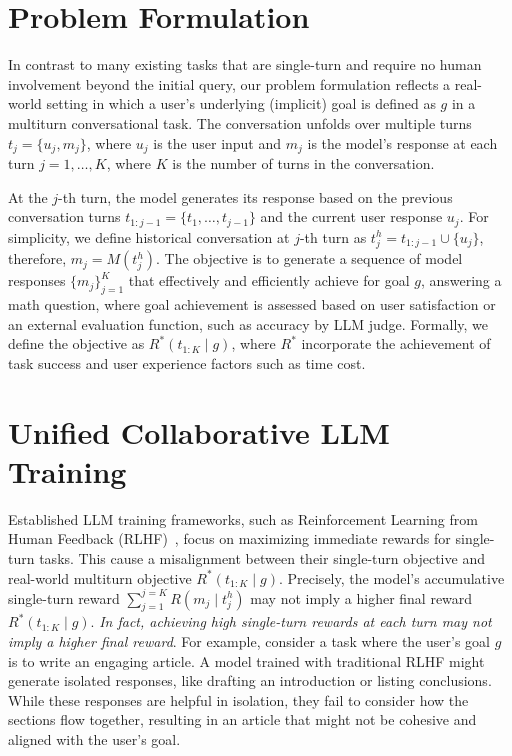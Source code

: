 
\section{Problem Formulation}






\label{sec:formulation}
In contrast to many existing tasks that are single-turn and require no human involvement beyond the initial query, our problem formulation reflects a real-world setting in which a user's underlying (implicit) goal is defined as $g$ in a multiturn conversational task. The conversation unfolds over multiple turns $t_j = \{u_j, m_j\}$, where $u_j$  is the user input and $m_j$  is the model's response at each turn $j = 1, \dots, K$, where $K$ is the number of turns in the conversation. 

At the $j$-th turn, the model generates its response based on the previous conversation turns $t_{1:j-1} = \{t_1, \dots, t_{j-1}\}$ and the current user response $u_j$. For simplicity, we define historical conversation at $j$-th turn as $t^h_j = t_{1:j-1}\cup \{u_j\}$, therefore, $m_j = M(t^h_j)$. 
The objective is to generate a sequence of model responses $\{m_j\}_{j=1}^{K}$ that effectively and efficiently achieve for goal $g$, \eg answering a math question, where goal achievement is assessed based on user satisfaction or an external evaluation function, such as accuracy by LLM judge.
Formally, we define the objective as $R^*(t_{1:K} \mid g)$, where $R^*$ incorporate the achievement of task success and user experience factors such as time cost.




\section{Unified Collaborative LLM Training}
\label{sec:method}





 Established LLM training frameworks, such as Reinforcement Learning from Human Feedback (RLHF)~\citep{rlhf}, focus on maximizing immediate rewards for single-turn tasks. This cause a misalignment between their single-turn objective and real-world multiturn objective $R^*(t_{1:K} \mid g)$. 
Precisely, the model's accumulative single-turn reward $\sum_{j=1}^{j=K} R(m_j \mid t_j^h)$ may not imply a higher final reward $R^*(t_{1:K} \mid g)$. \textit{In fact, achieving high single-turn rewards at each turn may not imply a higher final reward}. For example, consider a task where the user’s goal $g$ is to write an engaging article. A model trained with traditional RLHF might generate isolated responses, like drafting an introduction or listing conclusions. While these responses are helpful in isolation, they fail to consider how the sections flow together, resulting in an article that might not be cohesive and aligned with the user’s goal.







